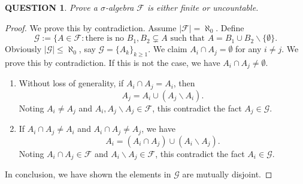 \documentclass[12pt]{article}
\renewcommand{\(}{\left(}%
\renewcommand{\)}{\right)}%
\renewcommand{\[}{\left[}%
\renewcommand{\]}{\right]}%
\newcommand{\f}{\mathscr{F}}
\newcommand{\g}{\mathscr{G}}
\newtheorem{question}{QUESTION}[section]}
\newtheorem{proof}{Proof.}}
\begin{document}
  \begin{question}
   Prove a $\sigma$-algebra $\f$ is either finite or uncountable.
  \end{question}
  \begin{proof}
   We prove this by contradiction. Assume $|\f|=\aleph_0$. Define
  	\begin{equation*}
  		\g:=\{A\in\f:\text{there is no }B_1, B_2\subsetneq A\text{ such that }A=B_1\cup B_2\backslash\{\emptyset\} .
  	\end{equation*}
  	Obviously $|\g|\leq \aleph_0$, say $\g=\{A_k\}_{k\geq 1}$. We claim $A_i\cap A_j=\emptyset$ for any $i\neq j$. We prove this by contradiction. If this is not the case, we have $A_i\cap A_j\neq \emptyset$.
  	\begin{enumerate}
  		\item Without loss of generality, if $A_i\cap A_j=A_i$, then 
  		\begin{equation*}
  			A_j=A_i\cup(A_j\backslash A_i).
  		\end{equation*}
  		Noting $A_i\neq A_j$ and $A_i,A_j\backslash A_j\in\f$, this contradict the fact $A_j\in\g$.
  		\item If $A_i\cap A_j\neq A_i$ and $A_i\cap A_j\neq A_j$, we have
  		\begin{equation*}
  			A_i=(A_i\cap A_j)\cup (A_i\backslash A_j).
  		\end{equation*}
  		Noting $A_i\cap A_j\in\f$ and $A_i\backslash A_j\in\f$, this contradict the fact $A_i\in\g$.
  	\end{enumerate}
  	In conclusion, we have shown the elements in $\g$ are mutually disjoint. 
  	

\end{proof}
\end{document}
